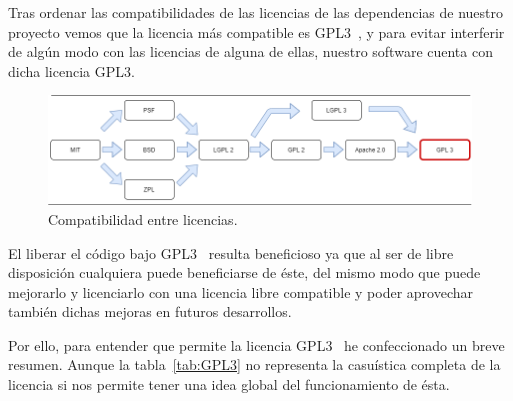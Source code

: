 Tras ordenar las compatibilidades de las licencias de las dependencias de nuestro proyecto vemos que la licencia más compatible es GPL3~\cite{lic:GPL3}, y para evitar interferir de algún modo con las licencias de alguna de ellas, nuestro software cuenta con dicha licencia GPL3.
\begin{figure}[h!]
    \centering
    \includegraphics[width=\textwidth]{img/Diagramas/LicenseComp.png}
    \caption{Compatibilidad entre licencias. } \label{LicenseComp}
\end{figure}

El liberar el código bajo GPL3~\cite{lic:GPL3} resulta beneficioso ya que al ser de libre disposición cualquiera puede beneficiarse de éste, del mismo modo que puede mejorarlo y licenciarlo con una licencia libre compatible y poder aprovechar también dichas mejoras en futuros desarrollos. 

Por ello, para entender que permite la licencia GPL3~\cite{lic:GPL3} he confeccionado un breve resumen. Aunque la tabla~\ref{tab:GPL3} no representa la casuística completa de la licencia si nos permite tener una idea global del funcionamiento de ésta.

